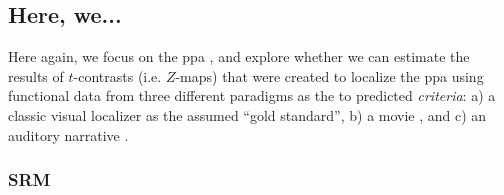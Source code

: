 \subsection{Here, we...}



Here again, we focus on the \ac{ppa} \citep[e.g.,][for
reviews]{epstein2014neural, aminoff2013role}, and explore whether we can
estimate the results of $t$-contrasts (i.e. $Z$-maps) that were created to
localize the \ac{ppa} using functional data from three different paradigms as
the to predicted \textit{criteria}:
%
a) a classic visual localizer \citep{sengupta2016extension} as the assumed
``gold standard'',
%
b) a movie \citep{haeusler2022processing}, and
%
c) an auditory narrative \citep{haeusler2022processing}.


\subsubsection{SRM}




